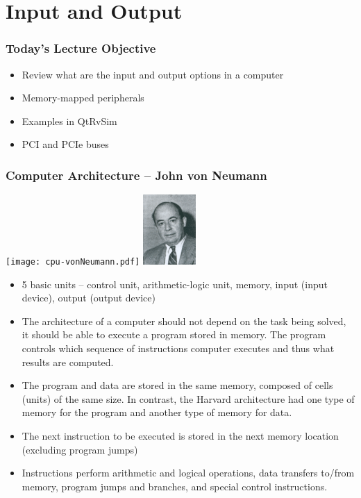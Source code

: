 \documentclass{beamer}
\subtitle{Lecture 07. Input and Output}
\author{Pavel Píša \phantom{xxxxxxxxx} Petr Štěpán \\ \small\texttt{pisa@fel.cvut.cz}\phantom{xxxx}\small\texttt{stepan@fel.cvut.cz}}
\begin{document}
\maketitle

\section{Input and Output}

\begin{frame}
\frametitle{Today's Lecture Objective}

\begin{itemize}
 \item Review what are the input and output options in a computer
 \item Memory-mapped peripherals
 \item Examples in QtRvSim
 \item PCI and PCIe buses
\end{itemize}
\end{frame}

\begin{frame}[shrink=10]
\frametitle{Computer Architecture -- John von Neumann}
\begin{center}
\texttt{[image: cpu-vonNeumann.pdf]}
\hfill
\includegraphics[width=0.15\textwidth]{fig/vonNeumann.png}
\end{center}
\begin{itemize}
\item 5 basic units – control unit, arithmetic-logic unit, memory, input (input device), output (output device)
\item The architecture of a computer should not depend on the task being solved, it should be able to execute a program stored in memory. The program controls which sequence of instructions computer executes and thus what results are computed.
\item The program and data are stored in the same memory, composed of cells (units) of the same size. In contrast, the Harvard architecture had one type of memory for the program and another type of memory for data.
\item The next instruction to be executed is stored in the next memory location (excluding program jumps)
\item Instructions perform arithmetic and logical operations, data transfers to/from memory, program jumps and branches, and special control instructions.
\end{itemize}
\end{frame}
\end{document}
